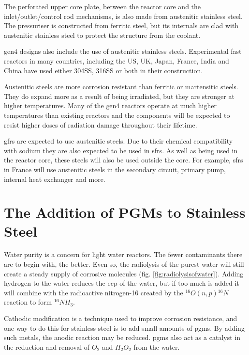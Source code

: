 The perforated upper core plate, between the reactor core and the inlet/outlet/control rod mechanisms, is also made from austenitic stainless steel.  The pressuriser is constructed from ferritic steel, but its internals are clad with austenitic stainless steel to protect the structure from the coolant.

\acrshort{gen4} designs also include the use of austenitic stainless steels.  Experimental fast reactors in many countries, including the US, UK, Japan, France, India and China have used either \gls{304SS}, \gls{316SS} or both in their construction.

Austenitic steels are more corrosion resistant than ferritic or martensitic steels.  They do expand more as a result of being irradiated, but they are stronger at higher temperatures.  Many of the \acrshort{gen4} reactors operate at much higher temperatures than existing reactors and the components will be expected to resist higher doses of radiation damage throughout their lifetime.

\acrshort{gfr}s are expected to use austenitic steels.  Due to their chemical compatibility with sodium they are also expected to be used in \acrshort{sfr}s.  As well as being used in the reactor core, these steels will also be used outside the core.  For example, \acrshort{sfr}s in France will use austenitic steels in the secondary circuit, primary pump, internal heat exchanger and more\cite{convsteelooc}.


\FloatBarrier



\section[Addition of PGMs]{The Addition of PGMs to Stainless Steel}

Water purity is a concern for light water reactors.  The fewer contaminants there are to begin with, the better.  Even so, the radiolysis of the purest water will still create a steady supply of corrosive molecules (fig. \ref{fig:radiolysisofwater}).  Adding hydrogen to the water reduces the \acrlong{ecp} of the water, but if too much is added it will combine with the radioactive nitrogen-16 created by the ${}^{16}O(n,p){}^{16}N$ reaction to form ${}^{16}NH_{3}$\cite{noblemetalchemical}.

Cathodic modification is a technique used to improve corrosion resistance, and one way to do this for stainless steel is to add small amounts of \acrfull{pgm}s\cite{potgieter1994}.  By adding such metals, the anodic reaction may be reduced.  \acrshort{pgm}s also act as a catalyst in the reduction and removal of $O_2$ and $H_2O_2$ from the water\cite{noblemetalchemical}.

